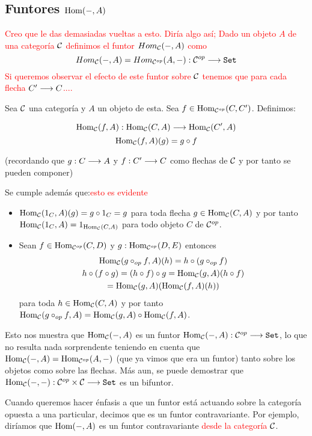 \subsection{Funtores $\operatorname{Hom}(-, A)$}
\textcolor{red}{Creo que le das demasiadas vueltas a esto. Diría algo así; Dado un objeto $A$ de una categoría $\mathcal{C}$ definimos el funtor $Hom_{\mathcal{C}}(-,A)$ como $$Hom_{\mathcal{C}}(-,A)=Hom_{\mathcal{C}^{op}}(A,-):\mathcal{C}^{op}\longrightarrow \texttt{Set}$$ Si queremos observar el efecto de este funtor sobre $\mathcal{C}$ tenemos que para cada flecha $C'\longrightarrow C$....}



Sea $\mathcal{C}$ una categoría y $A$ un objeto de esta.
Sea $f \in \operatorname{Hom}_{\mathcal{C}^{op}}(C, C')$. Definimos:

$$\Hom_{\C}(f, A) :
  \arr{
    \Hom_{\C}(C, A)
  }{
    \Hom_{\C}(C', A)
  }$$
$$\operatorname{Hom}_{\mathcal{C}}(f, A)(g) = g \circ f$$

(recordando que $g : C\longrightarrow A$ y $f : C'\longrightarrow C$ como
flechas de $\mathcal{C}$ y por tanto se pueden componer)

Se cumple además que:\textcolor{red}{esto es evidente}

\begin{itemize}
\item $\operatorname{Hom}_{\mathcal{C}}(1_C, A)(g) = g \circ 1_C = g$ para toda flecha
  $g\in \operatorname{Hom}_{\mathcal{C}}(C, A)$ y por tanto
  $\operatorname{Hom}_{\mathcal{C}}(1_C, A) = 1_{\operatorname{Hom}_{\mathcal{C}}(C, A)}$ para todo objeto $C$
  de $\mathcal{C}^{op}$.

\item Sean $f \in \operatorname{Hom}_{\mathcal{C}^{op}}(C, D)$ y $g : \operatorname{Hom}_{\mathcal{C}^{op}}(D, E)$
  entonces
  \begin{multline*}
    $$\Hom_{\C}(g \circ_{op} f, A)(h) = h \circ (g \circ_{op} f) \\
      h \circ (f \circ g) = (h \circ f) \circ g = \Hom_{\C}(g, A)(h \circ f) \\
      = \Hom_{\C}(g, A)(\Hom_{\C}(f, A)(h))$$
  \end{multline*}
  para toda $h \in \operatorname{Hom}_{\mathcal{C}}(C, A)$ y por tanto
  $\operatorname{Hom}_{\mathcal{C}}(g \circ_{op} f, A) = \operatorname{Hom}_{\mathcal{C}}(g, A) \circ \operatorname{Hom}_{\mathcal{C}}(f, A)$.
\end{itemize}

Esto nos muestra que $\operatorname{Hom}_{\mathcal{C}}(-, A)$ es un funtor
$\operatorname{Hom}_{\mathcal{C}}(-, A) : \mathcal{C}^{op}\longrightarrow \texttt{Set}$, lo que no resulta
nada sorprendente teniendo en cuenta que
$\operatorname{Hom}_{\mathcal{C}}(-, A) = \operatorname{Hom}_{\mathcal{C}^{op}}(A, -)$ (que ya vimos que
era un funtor) tanto sobre los objetos
como sobre las flechas. Más aun, se puede demostrar
que $\operatorname{Hom}_{\mathcal{C}}(-, -) : \mathcal{C}^{op} \times \mathcal{C}\longrightarrow \texttt{Set}$ es un bifuntor.

Cuando queremos hacer énfasis a que un funtor está actuando sobre
la categoría opuesta a una particular, decimos que es un funtor
contravariante. Por ejemplo, diríamos que $\operatorname{Hom}(-, A)$ es un funtor
contravariante \textcolor{red}{desde la categoría $\mathcal{C}$}.

